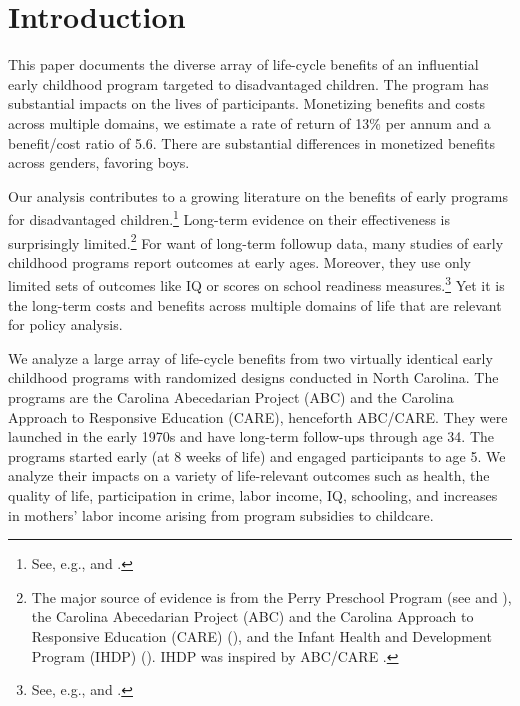 \clearpage
\doublespacing

\setcounter{page}{0}

\section{Introduction}

This paper documents the diverse array of life-cycle benefits of an influential early childhood program targeted to disadvantaged children. The program has substantial impacts on the lives of participants. Monetizing benefits and costs across multiple domains, we estimate a rate of return of 13\% per annum and a benefit/cost ratio of 5.6. There are substantial differences in monetized benefits across genders, favoring boys.

Our analysis contributes to a growing literature on the benefits of early programs for disadvantaged children.\footnote{See, e.g., \cite{Currie_2011_AER} and \cite{Elango_Hojman_etal_2016_Early-Edu}.} Long-term evidence on their effectiveness is surprisingly limited.\footnote{The major source of evidence is from the Perry Preschool Program (see \citealp{Schweinhart_Montie_ea_2005_BOOKlifetime} and \citealp{Heckman_Moon_etal_2010_RateofReturn,Heckman_Moon_etal_2010_QE}), the Carolina Abecedarian Project (ABC) and the Carolina Approach to Responsive Education (CARE) (\citealp{Ramey_Campbell_etal_2000_ADS,Ramey-etal_2012-ABC}), and the Infant Health and Development Program (IHDP) (\citealp{Gross_Spiker_etal_1997_BOOKHelpinglowbirth,Duncan_Sojourner_2013_JHR}). IHDP was inspired by ABC/CARE \citep[][]{Gross_Spiker_etal_1997_BOOKHelpinglowbirth}.} For want of long-term followup data, many studies of early childhood programs report outcomes at early ages. Moreover, they use only limited sets of outcomes like IQ or scores on school readiness measures.\footnote{See, e.g., \cite{Kline_Walters_2016_QJE} and \cite{Weiland_2013_CD_Impacts-of-Pre-K}.} Yet it is the long-term costs and benefits across multiple domains of life that are relevant for policy analysis.

We analyze a large array of life-cycle benefits from two virtually identical early childhood programs with randomized designs conducted in North Carolina. The programs are the Carolina Abecedarian Project (ABC) and the Carolina Approach to Responsive Education (CARE), henceforth ABC/CARE. They were launched in the early 1970s and have long-term follow-ups through age 34. The programs started early (at 8 weeks of life) and engaged participants to age 5. We analyze their impacts on a variety of life-relevant outcomes such as health, the quality of life, participation in crime, labor income, IQ, schooling, and increases in mothers' labor income arising from program subsidies to childcare.

